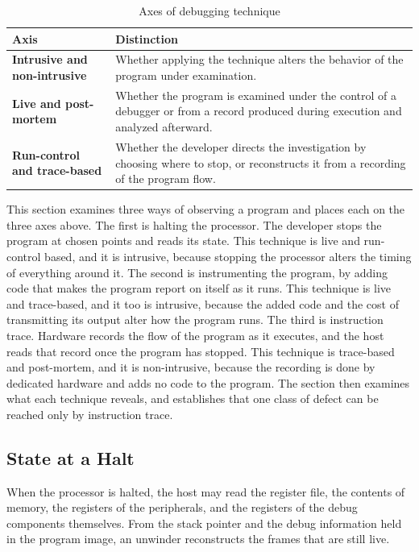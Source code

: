 \begin{table}[H]
    \centering
    \caption{Axes of debugging technique}
    \label{tab:debug_axes}
    \begin{tabularx}{\linewidth}{| @{}>{\hsize\bfseries}Y | >{\hsize}Y@{} |}
        \hline
        Axis & \textbf{Distinction} \\
        \hline
        Intrusive and non-intrusive & Whether applying the technique alters the behavior of the program under examination. \\
        \hline
        Live and post-mortem & Whether the program is examined under the control of a debugger or from a record produced during execution and analyzed afterward. \\
        \hline
        Run-control and trace-based & Whether the developer directs the investigation by choosing where to stop, or reconstructs it from a recording of the program flow. \\
        \hline
    \end{tabularx}
\end{table}

This section examines three ways of observing a program and places each on the three axes above. The first is halting the processor. The developer stops the program at chosen points and reads its state. This technique is live and run-control based, and it is intrusive, because stopping the processor alters the timing of everything around it. The second is instrumenting the program, by adding code that makes the program report on itself as it runs. This technique is live and trace-based, and it too is intrusive, because the added code and the cost of transmitting its output alter how the program runs. The third is instruction trace. Hardware records the flow of the program as it executes, and the host reads that record once the program has stopped. This technique is trace-based and post-mortem, and it is non-intrusive, because the recording is done by dedicated hardware and adds no code to the program. The section then examines what each technique reveals, and establishes that one class of defect can be reached only by instruction trace.

\subsection{State at a Halt}

When the processor is halted, the host may read the register file, the contents of memory, the registers of the peripherals, and the registers of the debug components themselves. From the stack pointer and the debug information held in the program image, an unwinder reconstructs the frames that are still live.

